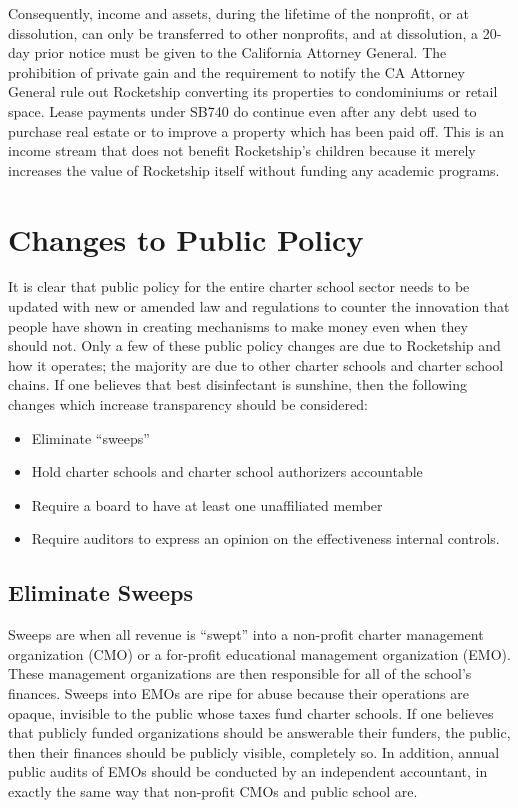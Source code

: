 Consequently, income and assets, during the lifetime of the nonprofit, or at dissolution, can only be transferred to other nonprofits, and at dissolution, a 20-day prior notice must be given to the California Attorney General. The prohibition of private gain and the requirement to notify the CA Attorney General rule out Rocketship converting its properties to condominiums or retail space. Lease payments under SB740 do continue even after any debt used to purchase real estate or to improve a property which has been paid off. This is an income stream that does not benefit Rocketship's children because it merely increases the value of Rocketship itself without funding any academic programs.

\section{Changes to Public Policy}%
\label{sec:chang-publ-policy}\indent

It is clear that public policy for the entire charter school sector needs to be updated with new or amended law and regulations to counter the innovation that people have shown in creating mechanisms to make money even when they should not. Only a few of these public policy changes are due to Rocketship and how it operates; the majority are due to other charter schools and charter school chains. If one believes that best disinfectant is sunshine, then the following changes which increase transparency should be considered:
\begin{itemize}
  \item Eliminate ``sweeps''
  \item Hold charter schools and charter school authorizers accountable
  \item Require a board to have at least one unaffiliated member
  \item Require auditors to express an opinion on the effectiveness internal controls.
\end{itemize}

\subsection{Eliminate Sweeps}%
\label{sec:eliminate-sweeps}\indent

Sweeps are when all revenue is ``swept'' into a non-profit charter management organization (CMO) or a for-profit educational management organization (EMO). These management organizations are then responsible for all of the school's finances. Sweeps into EMOs are ripe for abuse because their operations are opaque, invisible to the public whose taxes fund charter schools. If one believes that publicly funded organizations should be answerable their funders, the public, then their finances should be publicly visible, completely so. In addition, annual public audits of EMOs should be conducted by an independent accountant, in exactly the same way that non-profit CMOs and public school are.

